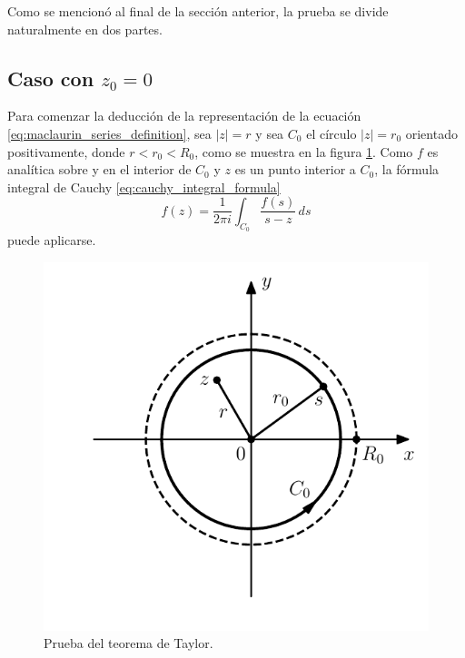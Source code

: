 \documentclass[a4paper]{report}
\begin{document}
Como se mencionó al final de la sección anterior, la prueba se divide naturalmente en dos partes.

\subsection*{Caso con \texorpdfstring{\(z_0=0\)}{z0=0}}

Para comenzar la deducción de la representación de la ecuación \ref{eq:maclaurin_series_definition}, sea \(|z|=r\) y sea \(C_0\) el círculo \(|z|=r_0\) orientado positivamente, donde \(r<r_0<R_0\), como se muestra en la figura \ref{fig:taylor_series_proof}. Como \(f\) es analítica sobre y en el interior de \(C_0\) y \(z\) es un punto interior a \(C_0\), la fórmula integral de Cauchy \ref{eq:cauchy_integral_formula} 
\begin{equation}\label{eq:taylor_series_proof_tmp0}
 f(z)=\frac{1}{2\pi i}\int_{C_0}\frac{f(s)}{s-z}\,ds
\end{equation}
puede aplicarse.
\begin{figure}[!htb]
  \begin{minipage}[c]{0.42\textwidth}
    \includegraphics[width=\textwidth]{figuras/taylor_series_proof.pdf}
  \end{minipage}\hfill
  \begin{minipage}[c]{0.48\textwidth}
    \caption{
       Prueba del teorema de Taylor.
    }\label{fig:taylor_series_proof}
  \end{minipage}
\end{figure}
\end{document}
